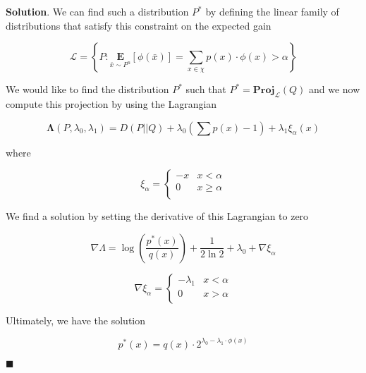 \documentclass[12pt]{article}
\theoremstyle{definition}
\newenvironment{s}{%
        \begin{trivlist} \item \textbf{Solution}. }{%
            \hspace*{\fill} $\blacksquare$\end{trivlist}}%
\begin{document}
{\begin{s}
We can find such a distribution $P^{*}$ by defining the linear family of distributions that satisfy this constraint on the expected gain

\begin{equation*}
\mathcal{L} = \left\{ P : \underset{\bar{x} \sim P^{n}}{\mathbf E}\left[\phi(\bar{x})\right] = \sum_{x\in \chi} p(x)\cdot \phi(x) > \alpha \right\}
\end{equation*}

We would like to find the distribution $P^{*}$ such that $P^{*} = \mathbf{Proj}_{\mathcal{L}}(Q)$ and we now compute this projection by using the Lagrangian

\begin{equation}
\mathbf{\Lambda}(P, \lambda_{0}, \lambda_{1}) = D(P||Q) + \lambda_{0}\left(\sum p(x) - 1\right) + \lambda_{1}\xi_{\alpha}(x)
\end{equation}

where 

\[\xi_{\alpha} = \begin{cases} 
      -x & x < \alpha \\
      0 & x \geq \alpha \\
   \end{cases}
\]

We find a solution by setting the derivative of this Lagrangian to zero

\begin{equation*}
\nabla \Lambda = \log\left(\frac{p^{*}(x)}{q(x)}\right) + \frac{1}{2\ln 2} + \lambda_{0} + \nabla \xi_{\alpha}
\end{equation*}

\[\nabla \xi_{\alpha} = \begin{cases} 
      -\lambda_{1} & x < \alpha \\
      0 & x > \alpha \\
   \end{cases}
\]

Ultimately, we have the solution

\begin{equation*}
p^{*}(x) = q(x) \cdot 2^{\lambda_{0} -\lambda_{1}\cdot \phi(x)}
\end{equation*}


\end{s}
\end{document}
